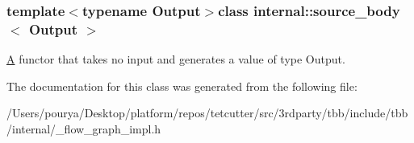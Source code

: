 \subsubsection*{template$<$typename Output$>$class internal\+::source\+\_\+body$<$ Output $>$}

\hyperlink{structA}{A} functor that takes no input and generates a value of type Output. 

The documentation for this class was generated from the following file\+:\begin{DoxyCompactItemize}
\item 
/\+Users/pourya/\+Desktop/platform/repos/tetcutter/src/3rdparty/tbb/include/tbb/internal/\+\_\+flow\+\_\+graph\+\_\+impl.\+h\end{DoxyCompactItemize}
